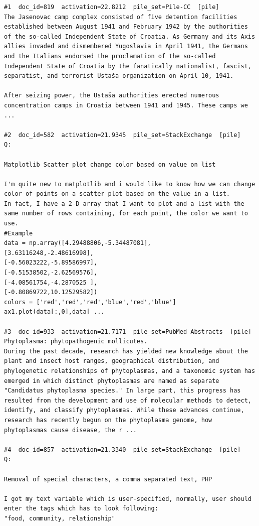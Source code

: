 \begin{verbatim}
#1  doc_id=819  activation=22.8212  pile_set=Pile-CC  [pile]
The Jasenovac camp complex consisted of five detention facilities established between August 1941 and February 1942 by the authorities of the so-called Independent State of Croatia. As Germany and its Axis allies invaded and dismembered Yugoslavia in April 1941, the Germans and the Italians endorsed the proclamation of the so-called Independent State of Croatia by the fanatically nationalist, fascist, separatist, and terrorist Ustaša organization on April 10, 1941.

After seizing power, the Ustaša authorities erected numerous concentration camps in Croatia between 1941 and 1945. These camps we ...

#2  doc_id=582  activation=21.9345  pile_set=StackExchange  [pile]
Q:

Matplotlib Scatter plot change color based on value on list

I'm quite new to matplotlib and i would like to know how we can change color of points on a scatter plot based on the value in a list.
In fact, I have a 2-D array that I want to plot and a list with the same number of rows containing, for each point, the color we want to use.
#Example
data = np.array([4.29488806,-5.34487081],
[3.63116248,-2.48616998],
[-0.56023222,-5.89586997],
[-0.51538502,-2.62569576],
[-4.08561754,-4.2870525 ],
[-0.80869722,10.12529582])
colors = ['red','red','red','blue','red','blue']
ax1.plot(data[:,0],data[ ...

#3  doc_id=933  activation=21.7171  pile_set=PubMed Abstracts  [pile]
Phytoplasma: phytopathogenic mollicutes.
During the past decade, research has yielded new knowledge about the plant and insect host ranges, geographical distribution, and phylogenetic relationships of phytoplasmas, and a taxonomic system has emerged in which distinct phytoplasmas are named as separate "Candidatus phytoplasma species." In large part, this progress has resulted from the development and use of molecular methods to detect, identify, and classify phytoplasmas. While these advances continue, research has recently begun on the phytoplasma genome, how phytoplasmas cause disease, the r ...

#4  doc_id=857  activation=21.3340  pile_set=StackExchange  [pile]
Q:

Removal of special characters, a comma separated text, PHP

I got my text variable which is user-specified, normally, user should enter the tags which has to look following: 
"food, community, relationship"


\end{verbatim}
